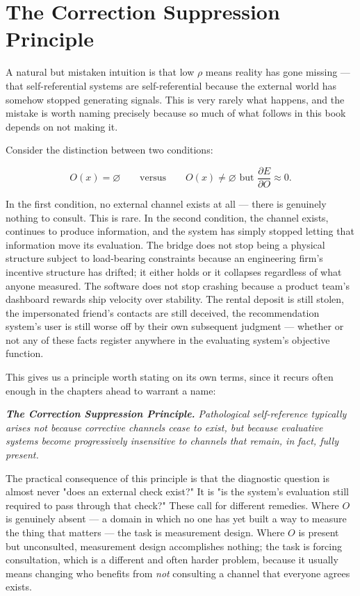 \documentclass[12pt,a4paper]{book}
\renewenvironment{quotation}
  {\list{}{\leftmargin=2em\rightmargin=2em}\item[]\itshape}
  {\endlist}
\begin{document}
\section{The Correction Suppression Principle}

A natural but mistaken intuition is that low $\rho$ means reality has gone missing — that self-referential systems are self-referential because the external world has somehow stopped generating signals. This is very rarely what happens, and the mistake is worth naming precisely because so much of what follows in this book depends on not making it.

Consider the distinction between two conditions:

\[O(x) = \varnothing \qquad \text{versus} \qquad O(x) \neq \varnothing \text{ but } \frac{\partial E}{\partial O} \approx 0.\]

In the first condition, no external channel exists at all — there is genuinely nothing to consult. This is rare. In the second condition, the channel exists, continues to produce information, and the system has simply stopped letting that information move its evaluation. The bridge does not stop being a physical structure subject to load-bearing constraints because an engineering firm's incentive structure has drifted; it either holds or it collapses regardless of what anyone measured. The software does not stop crashing because a product team's dashboard rewards ship velocity over stability. The rental deposit is still stolen, the impersonated friend's contacts are still deceived, the recommendation system's user is still worse off by their own subsequent judgment — whether or not any of these facts register anywhere in the evaluating system's objective function.

This gives us a principle worth stating on its own terms, since it recurs often enough in the chapters ahead to warrant a name:

\begin{quotation}\noindent \textbf{The Correction Suppression Principle.} Pathological self-reference typically arises not because corrective channels cease to exist, but because evaluative systems become progressively insensitive to channels that remain, in fact, fully present.\end{quotation}

The practical consequence of this principle is that the diagnostic question is almost never "does an external check exist?" It is "is the system's evaluation still required to pass through that check?" These call for different remedies. Where $O$ is genuinely absent — a domain in which no one has yet built a way to measure the thing that matters — the task is measurement design. Where $O$ is present but unconsulted, measurement design accomplishes nothing; the task is forcing consultation, which is a different and often harder problem, because it usually means changing who benefits from \emph{not} consulting a channel that everyone agrees exists.
\end{document}
